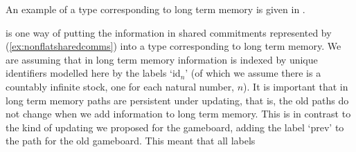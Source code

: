   
An example of a type corresponding to long term memory is given in
\nexteg{}.
\begin{ex} 
\label{ex:ltm} 
\end{ex} 
\preveg{} is one way of putting the information in shared commitments represented by
(\ref{ex:nonflatsharedcomms}) into a type corresponding to long term
memory.  We are assuming that in long term memory information is
indexed by unique identifiers modelled here by the labels `id$_n$' (of
which we assume there is a countably infinite stock, one for each
natural number, $n$).  It is important that in long term memory paths
are persistent under updating, that is, the old paths do not change
when we add information to long term memory.  This is in contrast to
the kind of updating we proposed for the gameboard, adding the label
`prev' to the path for the old gameboard.  This meant that all labels
